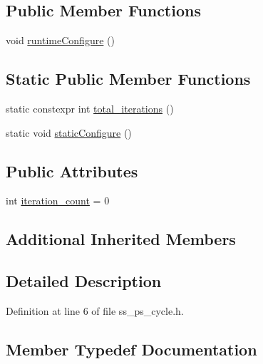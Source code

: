 \subsection*{Public Member Functions}
\begin{DoxyCompactItemize}
\item 
void \hyperlink{structsm__respira__1_1_1SsPSCycle_a0d9271efe37803ab84f78afdac76e5ff}{runtime\+Configure} ()
\end{DoxyCompactItemize}
\subsection*{Static Public Member Functions}
\begin{DoxyCompactItemize}
\item 
static constexpr int \hyperlink{structsm__respira__1_1_1SsPSCycle_a80357cef8fafd3d290e06cb22bb17ffc}{total\+\_\+iterations} ()
\item 
static void \hyperlink{structsm__respira__1_1_1SsPSCycle_a9ba272b79511ad861f97a9db43565514}{static\+Configure} ()
\end{DoxyCompactItemize}
\subsection*{Public Attributes}
\begin{DoxyCompactItemize}
\item 
int \hyperlink{structsm__respira__1_1_1SsPSCycle_a3d04af8ec50349cf85c868fd50e80166}{iteration\+\_\+count} = 0
\end{DoxyCompactItemize}
\subsection*{Additional Inherited Members}


\subsection{Detailed Description}


Definition at line 6 of file ss\+\_\+ps\+\_\+cycle.\+h.



\subsection{Member Typedef Documentation}
\mbox{\label{structsm__respira__1_1_1SsPSCycle_a7f7ede446472e94d9e483f4031ee8c0a}} 
